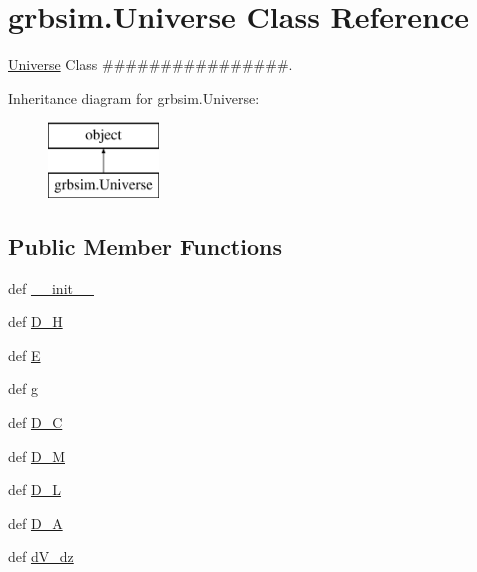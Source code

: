 \hypertarget{classgrbsim_1_1_universe}{\section{grbsim.\-Universe Class Reference}
\label{classgrbsim_1_1_universe}
}


\hyperlink{classgrbsim_1_1_universe}{Universe} Class \#\#\#\#\#\#\#\#\#\#\#\#\#\#\#\#.  


Inheritance diagram for grbsim.\-Universe\-:\begin{figure}[H]
\begin{center}
\leavevmode
\includegraphics[height=2.000000cm]{classgrbsim_1_1_universe}
\end{center}
\end{figure}
\subsection*{Public Member Functions}
\begin{DoxyCompactItemize}
\item 
def \hyperlink{classgrbsim_1_1_universe_a477782a9799e593606c8b93e32979575}{\-\_\-\-\_\-init\-\_\-\-\_\-}
\item 
def \hyperlink{classgrbsim_1_1_universe_a1ee331ee5b8c47d649975c1b830cb97a}{D\-\_\-\-H}
\item 
def \hyperlink{classgrbsim_1_1_universe_af182961238cc8a6cf74f967ace71fac3}{E}
\item 
def \hyperlink{classgrbsim_1_1_universe_a1520f08536b821def06948b39cf18427}{g}
\item 
def \hyperlink{classgrbsim_1_1_universe_afd74ef68d25363c13f2c94e96b2a8a8d}{D\-\_\-\-C}
\item 
def \hyperlink{classgrbsim_1_1_universe_ac6e2184d18fb119538df164a647fe13b}{D\-\_\-\-M}
\item 
def \hyperlink{classgrbsim_1_1_universe_a09d15f75aedac6a8b1375ac233b8c247}{D\-\_\-\-L}
\item 
def \hyperlink{classgrbsim_1_1_universe_ad58fe82edeb3e353f6eb9012f6c35ac0}{D\-\_\-\-A}
\item 
def \hyperlink{classgrbsim_1_1_universe_ac7ba7d8a9e9cd0c6fe8ce792e939752c}{d\-V\-\_\-dz}
\end{DoxyCompactItemize}
